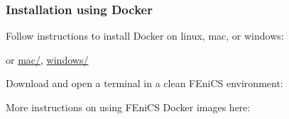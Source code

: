 \begin{frame}[fragile]
  \frametitle{Installation using Docker}


Follow instructions to install Docker on linux, mac, or windows:
  \begin{center}
     or \url{mac/}, \url{windows/}
  \end{center}

Download and open a terminal in a clean FEniCS environment:

More instructions on using FEniCS Docker images here:
  \begin{center}
  \end{center}

\end{frame}
